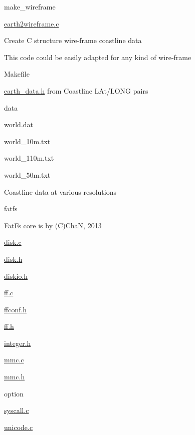\begin{DoxyItemize}
\item make\+\_\+wireframe
\begin{DoxyItemize}
\item \hyperlink{earth2wireframe_8c}{earth2wireframe.\+c}
\begin{DoxyItemize}
\item Create C structure wire-\/frame coastline data
\item This code could be easily adapted for any kind of wire-\/frame
\end{DoxyItemize}
\item Makefile
\begin{DoxyItemize}
\item \hyperlink{earth__data_8h}{earth\+\_\+data.\+h} from Coastline L\+At/\+L\+O\+NG pairs
\end{DoxyItemize}
\item data
\begin{DoxyItemize}
\item world.\+dat
\item world\+\_\+10m.\+txt
\item world\+\_\+110m.\+txt
\item world\+\_\+50m.\+txt
\begin{DoxyItemize}
\item Coastline data at various resolutions
\end{DoxyItemize}
\end{DoxyItemize}
\end{DoxyItemize}
\end{DoxyItemize}

fatfs
\begin{DoxyItemize}
\item Fat\+Fs core is by (C)ChaN, 2013
\begin{DoxyItemize}
\item \hyperlink{disk_8c}{disk.\+c}
\item \hyperlink{disk_8h}{disk.\+h}
\item \hyperlink{diskio_8h}{diskio.\+h}
\item \hyperlink{ff_8c}{ff.\+c}
\item \hyperlink{ffconf_8h}{ffconf.\+h}
\item \hyperlink{ff_8h}{ff.\+h}
\item \hyperlink{integer_8h}{integer.\+h}
\item \hyperlink{mmc_8c}{mmc.\+c}
\item \hyperlink{mmc_8h}{mmc.\+h}
\item option
\item \hyperlink{syscall_8c}{syscall.\+c}
\item \hyperlink{unicode_8c}{unicode.\+c}
\end{DoxyItemize}
\end{DoxyItemize}

